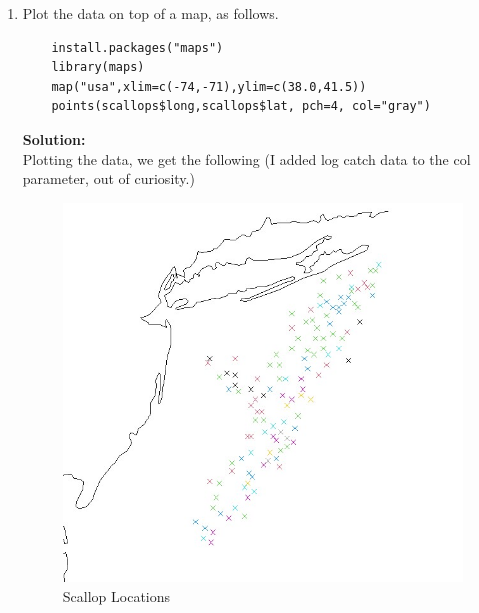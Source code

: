 \documentclass[12pt]{article}
\makeatletter
\theoremstyle{homework}
\newenvironment{exercise}[1]
{\def\@currentlabel{#1}\exercisecore}
{\endexercisecore}
\newcommand{\localhead}[1]{\par\smallskip\noindent\textbf{#1}\nobreak\\}%
\newcommand\solution{\localhead{Solution:}}
\makeatother
\begin{document}
\begin{exercise}{2}
\begin{enumerate}
  \item Plot the data on top of a map, as follows.
    \begin{verbatim}
    install.packages("maps")
    library(maps)
    map("usa",xlim=c(-74,-71),ylim=c(38.0,41.5))
    points(scallops$long,scallops$lat, pch=4, col="gray")
    \end{verbatim}
    \solution Plotting the data, we get the following (I added log catch data to the col parameter, out of curiosity.)
    \begin{figure}[H]
      \begin{center}
        \caption{Scallop Locations}
      \includegraphics[width = .70\textwidth]{Rplot04.jpg}
      \end{center}
    \end{figure}
  \end{enumerate}
\end{exercise}
\vspace{1in}
\end{document}
